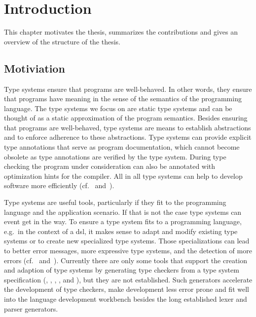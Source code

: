 \chapter{Introduction}
This chapter motivates the thesis, summarizes the contributions and
gives an overview of the structure of the thesis.

\section{Motiviation}
Type systems ensure that programs are well-behaved. In other words,
they ensure that programs have meaning in the sense of the semantics
of the programming language. The type systems we focus on are static
type systems and can be thought of as a static approximation of the
program semantics. Besides ensuring that programs are well-behaved,
type systems are means to establish abstractions and to enforce
adherence to these abstractions. Type systems can provide explicit
type annotations that serve as program documentation, which cannot
become obsolete as type annotations are verified by the type
system. During type checking the program under consideration can also
be annotated with optimization hints for the compiler. All in all type
systems can help to develop software more efficiently
(cf.~\cite{Petersen:2014:ECS:2597008.2597152}
and~\cite{Mayer:2012:ESI:2384616.2384666}).

Type systems are useful tools, particularly if they fit to the
programming language and the application scenario. If that is not the
case type systems can event get in the way. To ensure a type system
fits to a programming language, e.g.\ in the context of a \gls{dsl},
it makes sense to adapt and modify existing type systems or to create
new specialized type systems. Those specializations can lead to better
error messages, more expressive type systems, and the detection of more
errors (cf.~\cite{Thiemann02programmabletype}
and~\cite{vandenBrand:2010:FST:1868281.1868293}). Currently there are
only some tools that support the creation and adaption of type systems
by generating type checkers from a type system specification
(\cite{Markstrum:2010:JDP:1667048.1667049}, \cite{ortin2014automatic},
\cite{gast2005generator}, \cite{tomb2005automatic}, and
\cite{bergan2007typmix}), but they are not established. Such
generators accelerate the development of type checkers, make
development less error prone and fit well into the language
development workbench besides the long established lexer and parser
generators.

